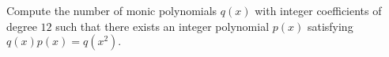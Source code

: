 Compute the number of monic polynomials $q(x)$ with integer coefficients of degree $12$ such that there exists an integer polynomial $p(x)$ satisfying $q(x)p(x) = q(x^2).$

